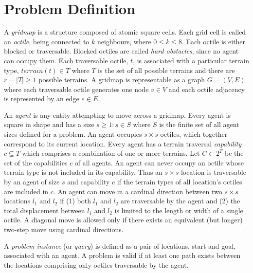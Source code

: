 \section{Problem Definition}
A \emph{gridmap} is a structure composed of atomic square cells.
Each grid cell is called an \emph{octile}, being connected to $k$ neighbours, where  $0 \leq k \leq 8$. 
Each octile is either blocked or traversable. 
Blocked octiles are called \emph{hard obstacles}, since no agent can occupy them.
Each traversable octile, $t$, is associated with a particular terrain type, $terrain(t) \in T$ where $T$ is the set of all possible terrains and there are $r = |T| \geq 1$ possible terrains.
A gridmap is representable as a graph $G = (V, E)$ where each traversable octile generates one node $v \in V$ and each octile adjacency is represented by an edge $e \in E$.
\par \indent
An \emph{agent} is any entity attempting to move across a gridmap. 
Every agent is square in shape and has a size $s \geq 1 : s \in S$ where $S$ is the finite set of all agent sizes defined for a problem.
An agent occupies $s \times s$ octiles, which together correspond to its current location. 
Every agent has a terrain traversal \emph{capability} $c \subseteq T$ which comprises a combination of one or more terrains. Let $C \subset 2^T$ be the set of the capabilities $c$ of all agents.
An agent can never occupy an octile whose terrain type is not included in its capability.
Thus an $s \times s$ location is traversable by an agent of size $s$ and capability $c$ if the terrain types of all location's octiles are included in $c$.
An agent can move in a cardinal direction between two $s \times s$ locations $l_1$ and $l_2$ if (1) both $l_1$ and $l_2$ are traversable by the agent and (2) the total displacement between $l_1$ and $l_2$ is limited to the length or width of a single octile. 
A diagonal move is allowed only if there exists an equivalent (but longer) two-step move using cardinal directions.
\par \indent
A \emph{problem instance} (or \emph{query}) is defined as a pair of locations, start and goal, associated with an agent. A problem is valid if at least one path exists between the locations comprising only octiles traversable by the agent. 
